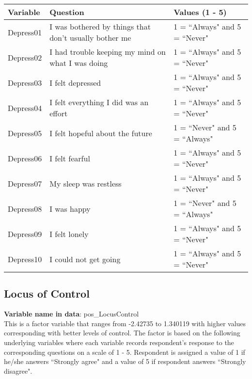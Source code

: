 \begin{table}[H]
\setlength{\tabcolsep}{20pt}
\begin{center}

\footnotesize{
	\begin{tabular}{l L{6cm} l}
	\hline
	\textbf{Variable} 	& \textbf{Question} 													& \textbf{Values (1 - 5)} \\
	\hline
	
	Depress01			& I was bothered by things that don’t usually bother me			& 1 = ``Always" and 5 = ``Never"  \\	
	Depress02			& I had trouble keeping my mind on what I was doing				& 1 = ``Always" and 5 = ``Never"  	\\
	Depress03			& I felt depressed														& 1 = ``Always" and 5 = ``Never"	 \\
	Depress04			& I felt everything I did was an effort								& 1 = ``Always" and 5 = ``Never"	 \\
	Depress05			& I felt hopeful about the future										& 1 = ``Never" and 5 = ``Always"	 \\
	Depress06			& I felt fearful 														& 1 = ``Always" and 5 = ``Never"	\\ 
	Depress07			& My sleep was restless												& 1 = ``Always" and 5 = ``Never" \\
	Depress08			& I was happy															& 1 = ``Never" and 5 = ``Always" \\
	Depress09			& I felt lonely															& 1 = ``Always" and 5 = ``Never"  \\
	Depress10			& I could not get going 												& 1 = ``Always" and 5 = ``Never" \\
	
	\hline
	
	\end{tabular}
}

\end{center}
\end{table}
\clearpage

\subsection{Locus of Control}
\textbf{Variable name in data}: pos\_LocusControl \\[.3cm]
This is a factor variable that ranges from -2.42735 to 1.340119 with higher values corresponding with better levels of control. The factor is based on the following underlying variables where each variable records respondent's response to the corresponding questions on a scale of 1 - 5. Respondent is assigned a value of 1 if he/she answers ``Strongly agree" and a value of 5 if respondent answers ``Strongly disagree". \\

